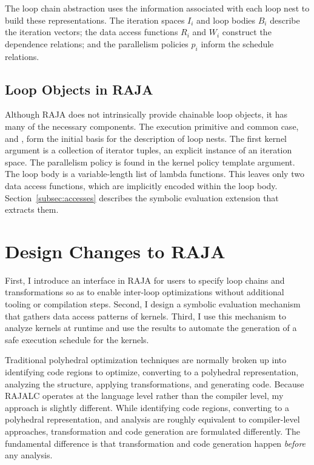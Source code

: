 The loop chain abstraction uses the information associated with each loop 
nest to build these representations.
The iteration spaces $I_{i}$ and loop bodies $B_{i}$ describe the iteration
vectors; the data access functions $R_{i}$ and $W_{i}$ construct the
dependence relations; and the parallelism policies $p_{i}$ inform the
schedule relations.


\subsection{Loop Objects in RAJA}

Although RAJA does not intrinsically provide chainable loop objects, it has many
of the necessary components.
The execution primitive and common case,  and  , form
the initial basis for the description of loop nests.
The first kernel argument is a collection of iterator tuples, an explicit
instance of an iteration space.
The parallelism policy is found in the kernel policy template argument.
The loop body is a variable-length list of lambda functions.
This leaves only two data access functions, which are implicitly encoded
within the loop body.
Section~\ref{subsec:accesses} describes the symbolic evaluation extension
that extracts them.

\section{Design Changes to RAJA}

First, I introduce an interface in RAJA for users to specify loop chains and transformations
so as to enable inter-loop optimizations without additional tooling or compilation steps.
Second, I design a symbolic evaluation mechanism that gathers data access patterns of
kernels.
Third, I use this mechanism to analyze kernels at runtime and use the results to automate the generation of a safe execution schedule for the kernels.


Traditional polyhedral optimization techniques are normally broken up into identifying code regions to optimize, converting to a polyhedral representation, analyzing the structure, applying transformations, and generating code.
Because RAJALC operates at the language level rather than the compiler level, my approach is slightly different. While identifying code regions, converting to a polyhedral representation, and analysis are roughly equivalent to compiler-level approaches, transformation and code generation are formulated differently. 
The fundamental difference is that transformation and code generation happen \textit{before} any analysis.


